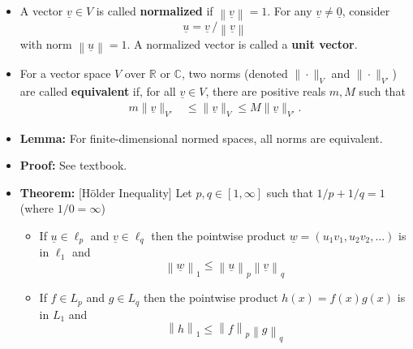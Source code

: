 \documentclass[11pt,twoside]{report}
\newcommand{\vecnot}{\underline}
\begin{document}
\begin{itemize}
\begin{itemize}
\end{itemize}

\item  A vector $\vecnot{v} \in V$ is called \textbf{normalized} if $\left\| \vecnot{v} \right\| = 1$.
For any $\vecnot{v} \neq \vecnot{0}$, consider 
\begin{equation*}
\vecnot{u} = \vecnot{v}\, / \left\| \vecnot{v} \right\|
\end{equation*}
with norm $\left\| \vecnot{u} \right\| = 1$.
A normalized vector is called a \textbf{unit vector}.



\item  For a vector space $V$ over $\mathbb{R}$ or $\mathbb{C}$, two norms (denoted $\|\cdot\|_{V}$ and $\|\cdot\|_{V'}$) are called \textbf{equivalent} if, for all $\vecnot{v} \in V$, there are positive reals $m,M$ such that
\begin{align*} 
m \| \vecnot{v} \|_{V'} & \leq \| \vecnot{v} \|_V \leq M \| \vecnot{v} \|_{V'}.
\end{align*}


\item \textbf{Lemma:}  For finite-dimensional normed spaces, all norms are equivalent.

\item \textbf{Proof:} See textbook. 


\item \textbf{Theorem:} [H\"older Inequality] 
Let $p, q \in [1, \infty]$ such that $1/p + 1/q = 1$ (where $1/0 = \infty$)
\begin{itemize}
\item If $\vecnot{u} \in \ell_p$ and $\vecnot{v} \in \ell_q$ then the pointwise product $\vecnot{w} = (u_1 v_1, u_2v_2, \dots )$ is in $\ell_1$ and 
\[
\left\|\vecnot{w}  \right \|_1 \le \left \| \vecnot{u} \right \|_p \left \| \vecnot{v} \right \|_q
\]
\item If $f \in L_p$ and $g \in L_q$ then the pointwise product $h(x) = f(x)g(x)$ is in $L_1$ and 
\[
\left\| h \right \|_1 \le \left \| f \right \|_p \left \| g \right \|_q
\]
\end{itemize}


\end{itemize}
\end{document}
